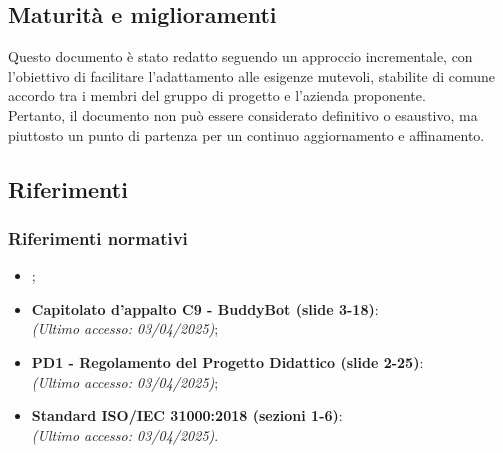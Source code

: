 \subsection{Maturità e miglioramenti}
Questo documento è stato redatto seguendo un approccio incrementale, 
con l'obiettivo di facilitare l'adattamento alle esigenze mutevoli, stabilite 
di comune accordo tra i membri del gruppo di progetto e l'azienda proponente.\\
Pertanto, il documento non può essere considerato definitivo o esaustivo, ma 
piuttosto un punto di partenza per un continuo aggiornamento e affinamento.

\subsection{Riferimenti}
\label{sec:riferimenti}

\subsubsection{Riferimenti normativi}
\begin{itemize}
    \item {}; \\
    \item \textbf{Capitolato d'appalto C9 - BuddyBot (slide 3-18)}: \\
    \emph{(Ultimo accesso: 03/04/2025)};\\
    \item \textbf{PD1 - Regolamento del Progetto Didattico (slide 2-25)}:\\
    \emph{(Ultimo accesso: 03/04/2025)};\\
    \item \textbf{Standard ISO/IEC 31000:2018 (sezioni 1-6)}: \\
    \emph{(Ultimo accesso: 03/04/2025)}.\\
\end{itemize}

